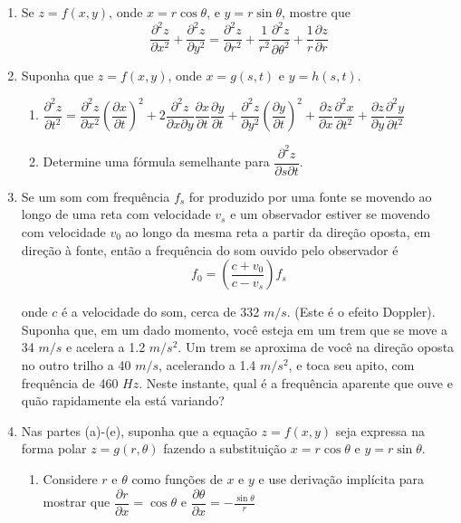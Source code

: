 \documentclass[11pt,a4paper]{article}
\begin{document}
\begin{enumerate}
	 \item Se $z = f(x,y)$, onde $x = r \cos \theta$, e $y = r \sin \theta$, mostre que
	 $$\dfrac{\partial^2 z}{\partial x^2}+ \dfrac{\partial^2 z}{\partial y^2} = \dfrac{\partial^2 z}{\partial r^2} + \displaystyle\frac{1}{r^2}\dfrac{\partial^2 z}{\partial \theta^2} + \displaystyle\frac{1}{r}\dfrac{\partial z}{\partial r}$$
	
	 \item Suponha que $z = f(x,y)$, onde $x = g(s,t)$ e $y = h(s,t)$.
	 \begin{enumerate}
	 	\item $\dfrac{\partial^2 z}{\partial t^2} = \dfrac{\partial^2 z}{\partial x^2} \left(\dfrac{\partial x}{\partial t}\right)^2 + 2 \dfrac{\partial^2 z}{\partial x \partial y} \dfrac{\partial x}{\partial t} \dfrac{\partial y}{\partial t} + \dfrac{\partial^2 z}{\partial y^2} \left(\dfrac{\partial y}{\partial t}\right)^2 + \dfrac{\partial z}{\partial x} \dfrac{\partial^2 x}{\partial t^2} + \dfrac{\partial z}{\partial y} \dfrac{\partial^2 y}{\partial t^2} $
	 	
	 	\item Determine uma fórmula semelhante para $\dfrac{\partial^2 z}{\partial s \partial t}$.
	 	
	 \end{enumerate}
	 
	 \item Se um som com frequência $f_s$ for produzido por uma fonte se movendo ao longo de uma reta com velocidade $v_s$ e um observador estiver se movendo com velocidade $v_0$ ao longo da mesma reta a partir da direção oposta, em direção à fonte, então a frequência do som ouvido pelo observador é
	 $$f_0 = \left(\frac{c + v_0}{c - v_s}\right) f_s$$ 
	 
	 onde $c$ é a velocidade do som, cerca de 332 $m/s$. (Este é o efeito Doppler). Suponha que, em um dado momento, você esteja em um trem que se move a 34 $m/s$ e acelera a 1.2 $m/s^2$. Um trem se aproxima de você na direção oposta no outro trilho a 40 $m/s$, acelerando a 1.4 $m/s^2$, e toca seu apito, com frequência de 460 $Hz$. Neste instante, qual é a frequência aparente que ouve e quão rapidamente ela está variando?
	 
	 \item Nas partes (a)-(e), suponha que a equação $z = f(x,y)$ seja expressa na forma polar $z = g(r, \theta)$ fazendo a substituição $x = r\cos \theta$ e $y = r\sin \theta$.
	 
	\begin{enumerate}
		\item Considere $r$ e $\theta$ como funções de $x$ e $y$ e use derivação implícita para mostrar que
		$\dfrac{\partial r}{\partial x} = \cos \theta $ e $\dfrac{\partial \theta}{\partial x} = - \displaystyle\frac{\sin \theta}{r}$
		

\end{enumerate}
\end{enumerate}
\end{document}

